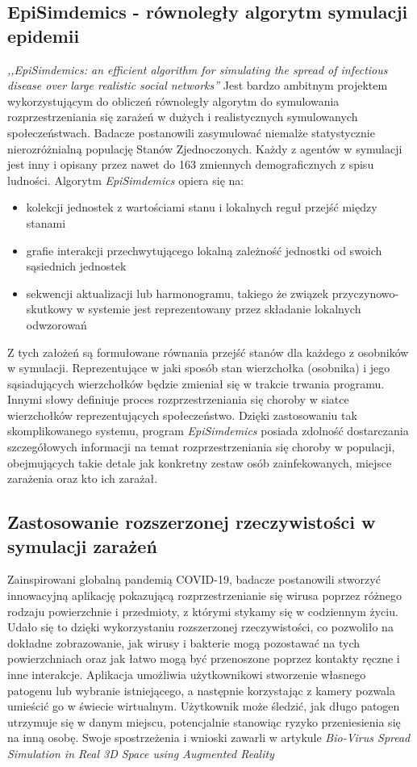 \subsection{\textbf{EpiSimdemics - równoległy algorytm symulacji epidemii}}
\textit{,,EpiSimdemics: an efficient algorithm for simulating the spread of infectious disease over large realistic social networks''} \cite{bib:konferencja} Jest bardzo ambitnym projektem wykorzystującym do obliczeń równoległy algorytm do symulowania rozprzestrzeniania się zarażeń w dużych i realistycznych symulowanych społeczeństwach. Badacze postanowili zasymulować niemalże statystycznie nierozróżnialną populację Stanów Zjednoczonych. Każdy z agentów w symulacji jest inny i opisany przez nawet do 163 zmiennych demograficznych z spisu ludności. Algorytm \textit{EpiSimdemics} opiera się na:
\begin{itemize}
	\item kolekcji jednostek z wartościami stanu i lokalnych reguł przejść między stanami
	\item grafie interakcji przechwytującego lokalną zależność jednostki od swoich sąsiednich jednostek
	\item sekwencji aktualizacji lub harmonogramu, takiego że związek przyczynowo-skutkowy w systemie jest 	reprezentowany przez składanie lokalnych odwzorowań
\end{itemize}
Z tych założeń są formułowane równania przejść stanów dla każdego z osobników w symulacji. Reprezentujące w jaki sposób stan wierzchołka (osobnika) i jego sąsiadujących wierzchołków będzie zmieniał się w trakcie trwania programu. Innymi słowy definiuje proces rozprzestrzeniania się choroby w siatce wierzchołków reprezentujących społeczeństwo.
	Dzięki zastosowaniu tak skomplikowanego systemu, program \textit{EpiSimdemics} posiada zdolność dostarczania szczegółowych informacji na temat rozprzestrzeniania się choroby w populacji, obejmujących takie detale jak konkretny zestaw osób zainfekowanych, miejsce zarażenia oraz kto ich zarażał.
\subsection{\textbf{Zastosowanie rozszerzonej rzeczywistości w symulacji zarażeń}}

Zainspirowani globalną pandemią COVID-19, badacze postanowili stworzyć innowacyjną aplikację pokazującą rozprzestrzenianie się wirusa poprzez różnego rodzaju powierzchnie i przedmioty, z którymi stykamy się w codziennym życiu. Udało się to dzięki wykorzystaniu rozszerzonej rzeczywistości, co pozwoliło na dokładne zobrazowanie, jak wirusy i bakterie mogą pozostawać na tych powierzchniach oraz jak łatwo mogą być przenoszone poprzez kontakty ręczne i inne interakcje. Aplikacja umożliwia użytkownikowi stworzenie własnego patogenu lub wybranie istniejącego, a następnie korzystając z kamery pozwala umieścić go w świecie wirtualnym. Użytkownik może śledzić, jak długo patogen utrzymuje się w danym miejscu, potencjalnie stanowiąc ryzyko przeniesienia się na inną osobę. Swoje spostrzeżenia i wnioski zawarli w artykule \textit{Bio-Virus Spread Simulation in Real 3D Space using Augmented Reality}\cite{bib:artykul2}

